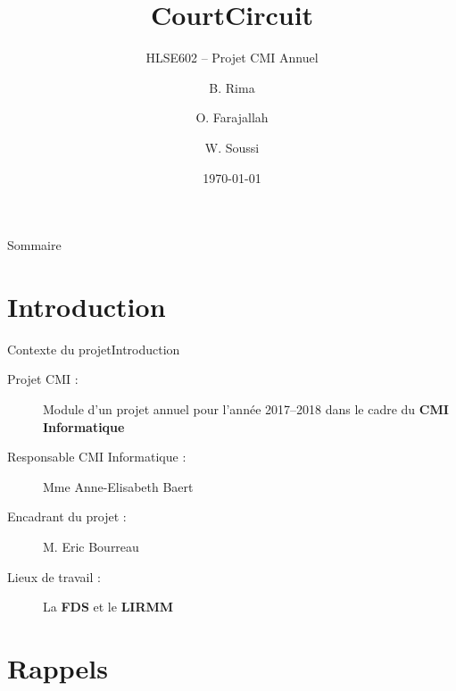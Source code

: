 \documentclass[usenames,dvipsnames]{beamer}
\title{CourtCircuit}
\subtitle{HLSE602 -- Projet CMI Annuel}
\author{B. Rima \and O. Farajallah \and W. Soussi}
\institute[UM]{L3 CMI Informatique}
\date{\today}
\begin{document}
\begin{frame}
\titlepage
\end{frame}
\begin{frame}{Sommaire}
\tableofcontents
\end{frame}
\section{Introduction}
\begin{frame}{Contexte du projet}{Introduction}
  \begin{description}
    \item [Projet CMI :] Module d'un projet annuel pour l'année 2017--2018 dans le cadre du \textbf{CMI Informatique}
    \item [Responsable CMI Informatique :] Mme Anne-Elisabeth Baert
    \item [Encadrant du projet :] M. Eric Bourreau
    \item [Lieux de travail :] La \textbf{FDS} et le \textbf{LIRMM}
  \end{description}
\end{frame}

\section{Rappels}
\end{document}

